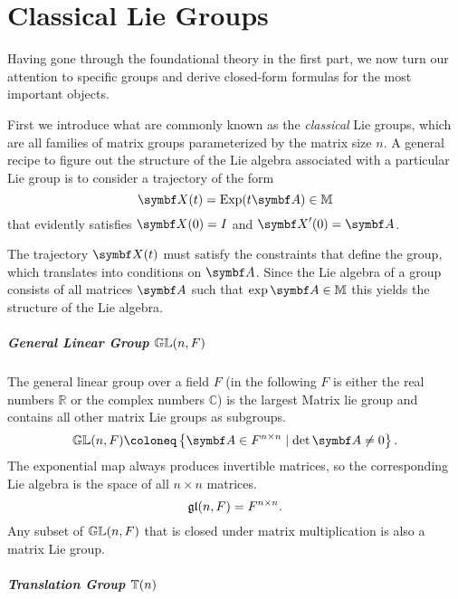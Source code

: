 
\chapter{Classical Lie Groups}

Having gone through the foundational theory in the first part, we now turn our attention to specific groups and derive closed-form formulas for the most important objects.

First we introduce what are commonly known as the \emph{classical} Lie groups, which are all families of matrix groups parameterized by the matrix size $n$. A general recipe to figure out the structure of the Lie algebra associated with a particular Lie group is to consider a trajectory of the form
\begin{equation}
  \label{eq:4}
  \X(t) = \Exp(t \A) \in \M
\end{equation}
that evidently satisfies $\X(0) = I$ and $\X'(0) = \A$.

The trajectory $\X(t)$ must satisfy the constraints that define the group, which translates into conditions on $\A$. Since the Lie algebra of a group consists of all matrices $\A$ such that $\exp \A \in \M$ this yields the structure of the Lie algebra.

\paragraph{General Linear Group ${\mathbb{GL}}(n, F)$}

The general linear group over a field $F$ (in the following $F$ is either the real numbers $\mathbb{R}$ or the complex numbers $\mathbb{C}$) is the largest Matrix lie group and contains all other matrix Lie groups as subgroups.
\begin{equation}
  \GL(n, F) \coloneq \left\{ \A \in F^{{n \times n}} \mid \det \A \neq 0 \right\}.
\end{equation}
The exponential map always produces invertible matrices, so the corresponding Lie algebra is the space of all $n \times n$ matrices.
\begin{equation}
  \mathfrak{gl}(n, F) = F^{n \times n}.
\end{equation}
Any subset of ${\mathbb{GL}}(n, F)$ that is closed under matrix multiplication is also a matrix Lie group.

\paragraph{Translation Group ${\mathbb{T}(n)}$}

